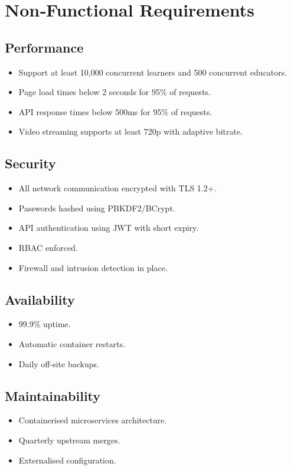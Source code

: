 \section{Non‑Functional Requirements}
\subsection{Performance}
\begin{itemize}
    \item Support at least 10,000 concurrent learners and 500 concurrent educators.
    \item Page load times below 2 seconds for 95\% of requests.
    \item API response times below 500ms for 95\% of requests.
    \item Video streaming supports at least 720p with adaptive bitrate.
\end{itemize}

\subsection{Security}
\begin{itemize}
    \item All network communication encrypted with TLS 1.2+.
    \item Passwords hashed using PBKDF2/BCrypt.
    \item API authentication using JWT with short expiry.
    \item RBAC enforced.
    \item Firewall and intrusion detection in place.
\end{itemize}

\subsection{Availability}
\begin{itemize}
    \item 99.9\% uptime.
    \item Automatic container restarts.
    \item Daily off‑site backups.
\end{itemize}

\subsection{Maintainability}
\begin{itemize}
    \item Containerised microservices architecture.
    \item Quarterly upstream merges.
    \item Externalised configuration.
\end{itemize}

